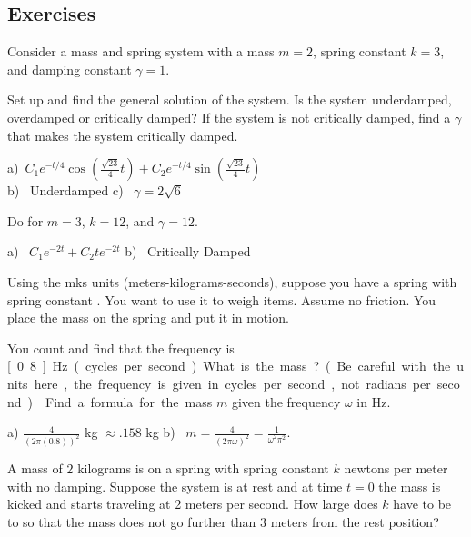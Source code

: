 \subsection{Exercises}

\begin{samepage}
\begin{exercise} \label{mv:ex1}
Consider a mass and spring system with a mass $m=2$, spring constant $k=3$, and
damping constant $\gamma=1$.
\begin{tasks}
\task Set up and find the general solution of the system.
\task Is the system underdamped, overdamped or critically damped?
\task If the system is not critically damped, find a $\gamma$ that makes the system
critically damped.
\end{tasks}
\end{exercise}
\end{samepage}
\comboSol{%
}
{%
a)~$C_1e^{-t/4}\cos\left(\frac{\sqrt{23}}{4}t\right) + C_2e^{-t/4}\sin\left(\frac{\sqrt{23}}{4}t\right)$ \\
b)~ Underdamped \quad c)~ $\gamma = 2\sqrt{6}$
}

\begin{exercise}
Do  for
$m=3$, $k=12$, and $\gamma=12$.
\end{exercise}
\comboSol{%
}
{%
a)~ $C_1e^{-2t} + C_2te^{-2t}$ \quad b)~ Critically Damped
}

\begin{exercise} \label{mv:exwt1}
Using the mks units (meters-kilograms-seconds),
suppose you have a spring with spring constant .
You want to use
it to weigh items.  Assume no friction.  You place the mass on
the spring and put it in motion.
\begin{tasks}
\task You count and find that the frequency is
\unit[0.8]{Hz} (cycles per second).  What is the mass? (Be careful with the units here, the frequency is given in cycles per second, not radians per second.)
\task Find a formula for the mass $m$
given the frequency $\omega$ in \unit{Hz}.
\end{tasks}
\end{exercise}
\comboSol{%
}
{%
a) $\frac{4}{(2\pi (0.8))^2}$ kg $\approx .158$ kg \quad b)~ $m = \frac{4}{(2\pi \omega)^2} = \frac{1}{\omega^2 \pi^2}$.
}

\begin{exercise}\ansMark%
A mass of $2$ kilograms is on a spring with spring constant $k$ newtons per
meter with no damping.  Suppose the system is at rest and at time $t=0$ the
mass is kicked and starts traveling at 2 meters per second.  How large
does $k$ have to be to so that the mass does not go further than 3 meters
from the rest position?
\end{exercise}

